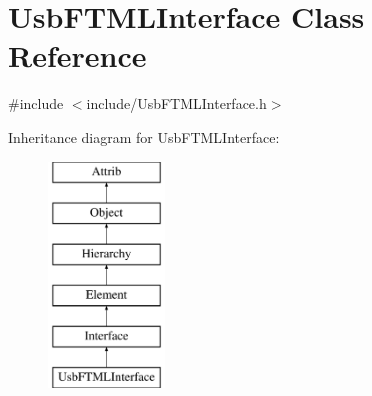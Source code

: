 \hypertarget{classUsbFTMLInterface}{}\section{Usb\+F\+T\+M\+L\+Interface Class Reference}
\label{classUsbFTMLInterface}


{\ttfamily \#include $<$include/\+Usb\+F\+T\+M\+L\+Interface.\+h$>$}

Inheritance diagram for Usb\+F\+T\+M\+L\+Interface\+:\begin{figure}[H]
\begin{center}
\leavevmode
\includegraphics[height=6.000000cm]{classUsbFTMLInterface}
\end{center}
\end{figure}
